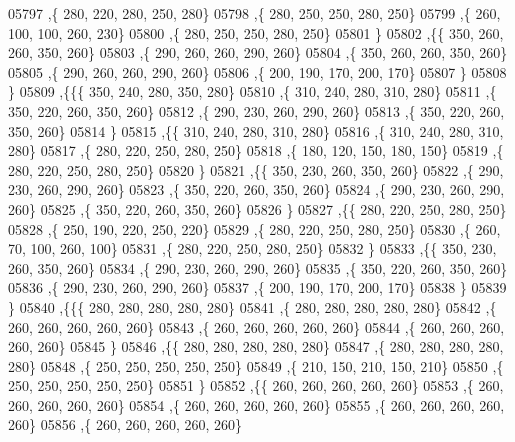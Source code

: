 \begin{DoxyCode}
05797     ,\{   280,   220,   280,   250,   280\}
05798     ,\{   280,   250,   250,   280,   250\}
05799     ,\{   260,   100,   100,   260,   230\}
05800     ,\{   280,   250,   250,   280,   250\}
05801     \}
05802    ,\{\{   350,   260,   260,   350,   260\}
05803     ,\{   290,   260,   260,   290,   260\}
05804     ,\{   350,   260,   260,   350,   260\}
05805     ,\{   290,   260,   260,   290,   260\}
05806     ,\{   200,   190,   170,   200,   170\}
05807     \}
05808    \}
05809   ,\{\{\{   350,   240,   280,   350,   280\}
05810     ,\{   310,   240,   280,   310,   280\}
05811     ,\{   350,   220,   260,   350,   260\}
05812     ,\{   290,   230,   260,   290,   260\}
05813     ,\{   350,   220,   260,   350,   260\}
05814     \}
05815    ,\{\{   310,   240,   280,   310,   280\}
05816     ,\{   310,   240,   280,   310,   280\}
05817     ,\{   280,   220,   250,   280,   250\}
05818     ,\{   180,   120,   150,   180,   150\}
05819     ,\{   280,   220,   250,   280,   250\}
05820     \}
05821    ,\{\{   350,   230,   260,   350,   260\}
05822     ,\{   290,   230,   260,   290,   260\}
05823     ,\{   350,   220,   260,   350,   260\}
05824     ,\{   290,   230,   260,   290,   260\}
05825     ,\{   350,   220,   260,   350,   260\}
05826     \}
05827    ,\{\{   280,   220,   250,   280,   250\}
05828     ,\{   250,   190,   220,   250,   220\}
05829     ,\{   280,   220,   250,   280,   250\}
05830     ,\{   260,    70,   100,   260,   100\}
05831     ,\{   280,   220,   250,   280,   250\}
05832     \}
05833    ,\{\{   350,   230,   260,   350,   260\}
05834     ,\{   290,   230,   260,   290,   260\}
05835     ,\{   350,   220,   260,   350,   260\}
05836     ,\{   290,   230,   260,   290,   260\}
05837     ,\{   200,   190,   170,   200,   170\}
05838     \}
05839    \}
05840   ,\{\{\{   280,   280,   280,   280,   280\}
05841     ,\{   280,   280,   280,   280,   280\}
05842     ,\{   260,   260,   260,   260,   260\}
05843     ,\{   260,   260,   260,   260,   260\}
05844     ,\{   260,   260,   260,   260,   260\}
05845     \}
05846    ,\{\{   280,   280,   280,   280,   280\}
05847     ,\{   280,   280,   280,   280,   280\}
05848     ,\{   250,   250,   250,   250,   250\}
05849     ,\{   210,   150,   210,   150,   210\}
05850     ,\{   250,   250,   250,   250,   250\}
05851     \}
05852    ,\{\{   260,   260,   260,   260,   260\}
05853     ,\{   260,   260,   260,   260,   260\}
05854     ,\{   260,   260,   260,   260,   260\}
05855     ,\{   260,   260,   260,   260,   260\}
05856     ,\{   260,   260,   260,   260,   260\}

\end{DoxyCode}
